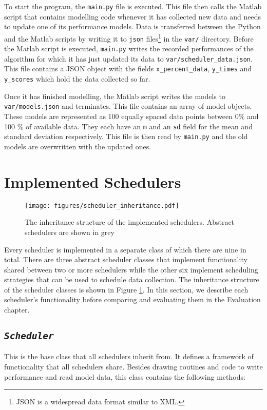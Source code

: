 \documentclass[a4paper,12pt,twoside,openright]{report}
\begin{document}
To start the program, the \texttt{main.py} file is executed. This file then calls the Matlab script that contains modelling code whenever it has collected new data and needs to update one of its performance models. Data is transferred between the Python and the Matlab scripts by writing it to \texttt{json} files\footnote{JSON is a widespread data format similar to XML.} in the \texttt{var/} directory.  Before the Matlab script is executed, \texttt{main.py} writes the recorded performances of the algorithm for which it has just updated its data to \texttt{var/scheduler\_data.json}. This file contains a JSON object with the fields \texttt{x\_percent\_data}, \texttt{y\_times} and \texttt{y\_scores} which hold the data collected so far.

Once it has finished modelling, the Matlab script writes the models to \texttt{var/models.json} and terminates. This file contains an array of model objects. These models are represented as 100 equally spaced data points between 0\% and 100 \% of available data. They each have an \texttt{m} and an \texttt{sd} field for the mean and standard deviation respectively. This file is then read by \texttt{main.py} and the old models are overwritten with the updated ones.



\section{Implemented Schedulers}
\begin{figure}
    \centerline{\texttt{[image: figures/scheduler\_inheritance.pdf]}}
  \caption{The inheritance structure of the implemented schedulers. Abstract schedulers are shown in grey}
    \label{schedulerinheritance}
\end{figure}

Every scheduler is implemented in a separate class of which there are nine in total. There are three abstract scheduler classes that implement functionality shared between two or more schedulers while the other six implement scheduling strategies that can be used to schedule data collection. The inheritance structure of the scheduler classes is shown in Figure \ref{schedulerinheritance}. In this section, we describe each scheduler's functionality before comparing and evaluating them in the Evaluation chapter.

\subsection{\texttt{\textit{Scheduler}}}
This is the base class that all schedulers inherit from. It defines a framework of functionality that all schedulers share. Besides drawing routines and code to write performance and read model data, this class contains the following methods:
\end{document}
